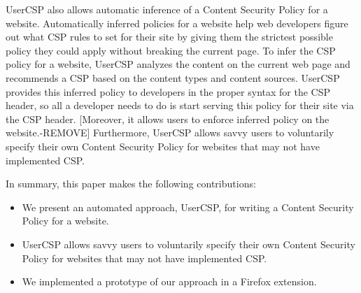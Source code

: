 UserCSP also allows automatic inference of a Content Security Policy
for a website. Automatically inferred policies for a website help web
developers figure out what CSP rules to set for their site by giving
them the strictest possible policy they could apply without breaking
the current page.  To infer the CSP policy for a website, UserCSP
analyzes the content on the current web page and recommends a CSP
based on the content types and content sources. UserCSP provides this
inferred policy to developers in the proper syntax for the CSP header,
so all a developer needs to do is start serving this policy for their
site via the CSP header. [Moreover, it allows users to enforce
  inferred policy on the website.-REMOVE] Furthermore, UserCSP allows
savvy users to voluntarily specify their own Content Security Policy
for websites that may not have implemented CSP.

In summary, this paper makes the following contributions:

\begin {itemize}

\item We present an automated approach, UserCSP, for writing a Content
  Security Policy for a website.

\item UserCSP allows savvy users to voluntarily specify their own
  Content Security Policy for websites that may not have implemented
  CSP.

\item We implemented a prototype of our approach in a Firefox
  extension.

\end{itemize}
